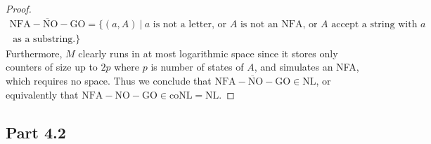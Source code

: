 \documentclass[a4paper,11pt]{article}
\newcommand{\pipe}{\ \vert \ }
\numberwithin{equation}{section}
\begin{document}
\begin{proof}
\begin{equation*}
			\begin{aligned}
			\overline{\mathrm{NFA-NO-GO}}=\{(a,A)\pipe a\text{ is not a letter, or }A \text{ is not an NFA, or }A\text{ accept a string with }a\\
			\text{ as a substring.}   \}
			\end{aligned}
		\end{equation*}
		Furthermore, $ M $ clearly runs in at most logarithmic space since it stores only counters of size up to $ 2p $ where $ p $ is number of states of $ A $, and simulates an NFA, which requires no space. Thus we conclude that $ \overline{\mathrm{NFA-NO-GO}}\in \text{NL} $, or equivalently that $ \mathrm{NFA-NO-GO}\in\text{coNL}=\text{NL} $.
	\end{proof}
	\subsection*{Part 4.2}
	
\end{document}
